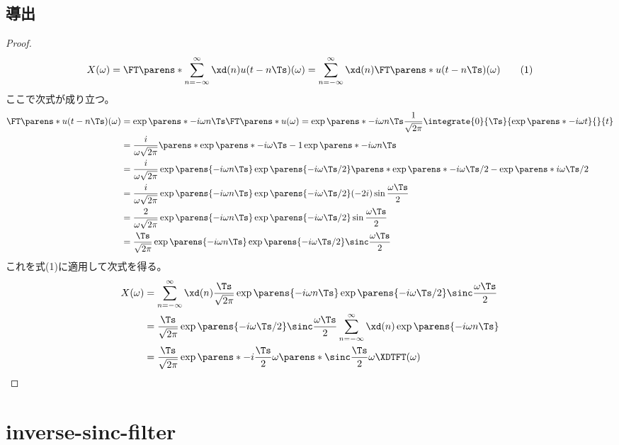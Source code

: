         \subsection{導出}
            \begin{proof}
                \[ X(\omega) = \FT\parens*{\sum_{n=-\infty}^\infty \xd(n)u(t-n\Ts)}(\omega) = \sum_{n=-\infty}^\infty \xd(n)\FT\parens*{u(t-n\Ts)}(\omega) \tag{1} \]
                ここで次式が成り立つ。
                \begin{align*}
                    \FT\parens*{u(t-n\Ts)}(\omega) &= \exp\parens*{-i \omega n\Ts}\FT\parens*{u}(\omega) = \exp\parens*{-i \omega n\Ts}\frac{1}{\sqrt{2\pi}}\integrate{0}{\Ts}{\exp\parens*{-i\omega t}}{}{t} \\
                    &= \frac{i}{\omega\sqrt{2\pi}}\parens*{\exp\parens*{-i \omega\Ts}-1}\exp\parens*{-i \omega n\Ts} \\
                    &= \frac{i}{\omega\sqrt{2\pi}}\exp\parens{-i \omega n\Ts}\exp\parens{-i \omega\Ts/2}\parens*{\exp\parens*{-i \omega\Ts/2} - \exp\parens*{i \omega\Ts/2}} \\
                    &= \frac{i}{\omega\sqrt{2\pi}}\exp\parens{-i \omega n\Ts}\exp\parens{-i \omega\Ts/2}(-2i)\sin\frac{\omega\Ts}{2} \\
                    &= \frac{2}{\omega\sqrt{2\pi}}\exp\parens{-i \omega n\Ts}\exp\parens{-i \omega\Ts/2}\sin\frac{\omega\Ts}{2} \\
                    &= \frac{\Ts}{\sqrt{2\pi}}\exp\parens{-i \omega n\Ts}\exp\parens{-i \omega\Ts/2}\sinc\frac{\omega\Ts}{2}
                \end{align*}
                これを式(1)に適用して次式を得る。
                \begin{align*}
                    X(\omega) &= \sum_{n=-\infty}^\infty \xd(n)\frac{\Ts}{\sqrt{2\pi}}\exp\parens{-i \omega n\Ts}\exp\parens{-i \omega\Ts/2}\sinc\frac{\omega\Ts}{2} \\
                    &= \frac{\Ts}{\sqrt{2\pi}}\exp\parens{-i \omega\Ts/2}\sinc\frac{\omega\Ts}{2} \sum_{n=-\infty}^\infty \xd(n)\exp\parens{-i \omega n\Ts} \\
                    &= \frac{\Ts}{\sqrt{2\pi}}\exp\parens*{-i\frac{\Ts}{2}\omega}\parens*{\sinc \frac{\Ts}{2}\omega}\XDTFT(\omega)
                \end{align*}
            \end{proof}
    \section{inverse-sinc-filter}
